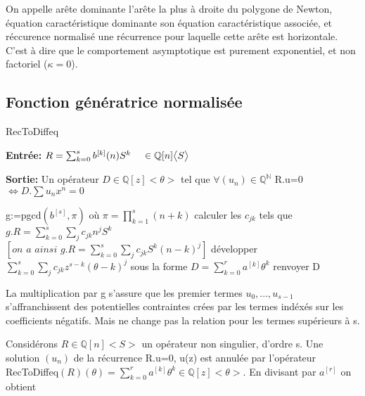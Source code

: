 \documentclass[a4paper,10.5pt]{article}
\begin{document}
	\begin{definition} On appelle arête dominante l'arête la plus à droite du polygone de Newton, équation caractéristique dominante son équation caractéristique associée, et réccurence normalisé une récurrence pour laquelle cette arête est horizontale. C'est à dire que le comportement asymptotique est purement exponentiel, et non factoriel ($\kappa=0$).
	\end{definition}
	
	\subsection{Fonction génératrice normalisée}
	
	\begin{algorithm}
		\caption{RecToDiffeq}
		
		\vspace{2mm}
		
		\textbf{Entrée:} $R=\sum_{k=0}^{s} b^{[k]}(n)S^{k} \hspace{4mm} \in \mathbb{Q}[n]\big<S\big>$
		
		\textbf{Sortie:} Un opérateur $D \in \mathbb{Q}[z] \big<\theta\big>$ tel que $\forall (u_{n}) \in \mathbb{Q}^{\mathbb{N}}$ R.u=0 $\iff D.\sum u_{n}x^{n}=0$ 
		
		\begin{algorithmic}[1]
			\vspace{3mm}
			\STATE g:=pgcd$(b^{[s]},\pi)$ où $\pi=\prod_{k=1}^{s}(n+k)$
			\vspace{3mm}
			\STATE calculer les $c_{jk}$ tels que $g.R=\sum_{k=0}^{s}\sum_{j}c_{jk}n^{j}S^{k}$\\
			\vspace{3mm}
			$[\textit{on a ainsi } g.R=\sum_{k=0}^{s}\sum_{j}c_{jk}S^{k}(n-k)^{j}]$
			\vspace{3mm}
			\STATE développer $\sum_{k=0}^{s}\sum_{j} c_{jk}z^{s-k}(\theta-k)^{j}$ sous la forme $D=\sum_{k=0}^{r} a^{[k]}\theta^{k}$
			\vspace{3mm}
			\STATE renvoyer D
		\end{algorithmic}
		
	\end{algorithm}
	La multiplication par g s'assure que les premier termes $u_{0},...,u_{s-1}$
	s'affranchissent des potentielles contraintes crées par les termes indéxés sur les coefficients négatifs. Mais ne change pas la relation pour les termes supérieurs à s.
	
	Considérons $R \in \mathbb{Q}[n]\big< S\big>$ un opérateur non singulier, d'ordre s. Une solution $(u_{n})$ de la récurrence R.u=0, u(z) est annulée par l'opérateur RecToDiffeq$(R)(\theta)=\sum_{k=0}^{r}a^{[k]}\theta^{k} \in \mathbb{Q}[z]\big< \theta\big>$. En divisant par $a^{[r]}$ on obtient
	
\end{document}
